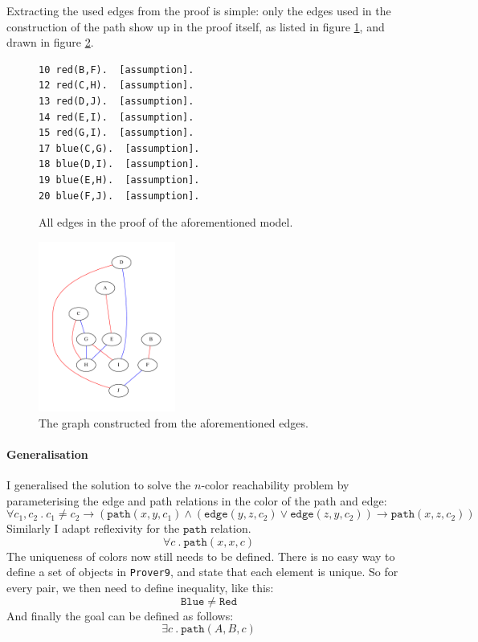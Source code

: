 \documentclass[12pt]{article}
\newcommand{\bimp}{\rightarrow}
\newcommand{\band}{\wedge}
\newcommand{\bor}{\vee}
\newcommand{\provernine}{\texttt{Prover9}\xspace}
\newcommand{\edge}[3]{\mathtt{edge}(#1, #2, #3)}
\newcommand{\path}[3]{\mathtt{path}(#1, #2, #3)}
\begin{document}
Extracting the used edges from the proof is simple:
only the edges used in the construction of the path show up in the proof itself,
as listed in figure \ref{fig:proof-assump}, and drawn in figure \ref{fig:proof-graph}.
\begin{figure}[H]
	\begin{center}
		\begin{lstlisting}[frame=single]
10 red(B,F).  [assumption].
12 red(C,H).  [assumption].
13 red(D,J).  [assumption].
14 red(E,I).  [assumption].
15 red(G,I).  [assumption].
17 blue(C,G).  [assumption].
18 blue(D,I).  [assumption].
19 blue(E,H).  [assumption].
20 blue(F,J).  [assumption].
		\end{lstlisting}
	\end{center}
	\caption{\label{fig:proof-assump} All edges in the proof of the aforementioned model.}
\end{figure}
\begin{figure}[H]
	\begin{center}
		\includegraphics[width=0.4\textwidth]{graph-fixed.pdf}
	\end{center}
	\caption{\label{fig:proof-graph} The graph constructed from the aforementioned edges.}
\end{figure}

\paragraph{Generalisation}
I generalised the solution to solve the $n$-color reachability problem
by parameterising the edge and path relations in the color of the path and edge:
\[ \forall c_1, c_2 ~.~ c_1 \neq c_2 \bimp (\path{x}{y}{c_1} \band ( \edge{y}{z}{c_2} \bor \edge{z}{y}{c_2} ) \bimp \path{x}{z}{c_2} ) \]
Similarly I adapt reflexivity for the $\mathtt{path}$ relation.
\[ \forall c ~.~ \path{x}{x}{c} \]
The uniqueness of colors now still needs to be defined.
There is no easy way to define a set of objects in \provernine, and state
that each element is unique.
So for every pair, we then need to define inequality, like this:
\[ \mathtt{Blue} \neq \mathtt{Red} \]
And finally the goal can be defined as follows:
\[ \exists c ~.~ \path{A}{B}{c} \]
\end{document}
